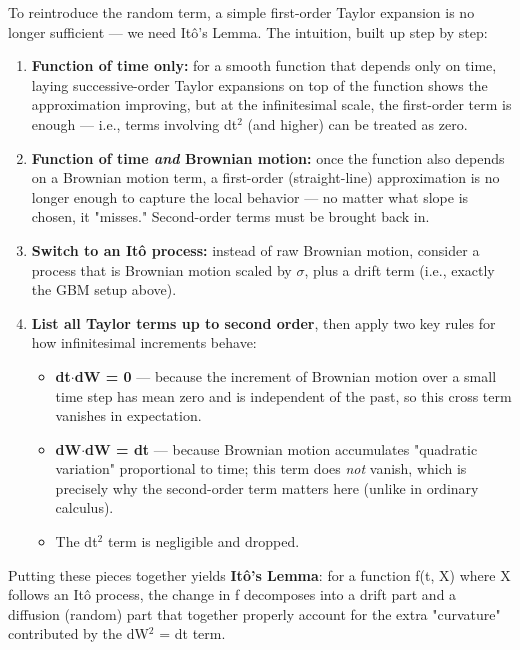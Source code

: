 \documentclass[12pt,openany]{book}
\theoremstyle{definition}
\theoremstyle{remark}
\begin{document}
To reintroduce the random term, a simple first-order Taylor expansion is no longer sufficient --- we need Itô's Lemma. The intuition, built up step by step:

\begin{enumerate}
\item \textbf{Function of time only:} for a smooth function that depends only on time, laying successive-order Taylor expansions on top of the function shows the approximation improving, but at the infinitesimal scale, the first-order term is enough --- i.e., terms involving dt\(^2\) (and higher) can be treated as zero.


\item \textbf{Function of time \emph{and} Brownian motion:} once the function also depends on a Brownian motion term, a first-order (straight-line) approximation is no longer enough to capture the local behavior --- no matter what slope is chosen, it "misses." Second-order terms must be brought back in.


\item \textbf{Switch to an Itô process:} instead of raw Brownian motion, consider a process that is Brownian motion scaled by \(\sigma\), plus a drift term (i.e., exactly the GBM setup above).


\item \textbf{List all Taylor terms up to second order}, then apply two key rules for how infinitesimal increments behave:

\begin{itemize}
\item \textbf{dt\(\cdot\)dW = 0} --- because the increment of Brownian motion over a small time step has mean zero and is independent of the past, so this cross term vanishes in expectation.


\item \textbf{dW\(\cdot\)dW = dt} --- because Brownian motion accumulates "quadratic variation" proportional to time; this term does \emph{not} vanish, which is precisely why the second-order term matters here (unlike in ordinary calculus).


\item The dt\(^2\) term is negligible and dropped.


\end{itemize}


\end{enumerate}

Putting these pieces together yields \textbf{Itô's Lemma}: for a function f(t, X) where X follows an Itô process, the change in f decomposes into a drift part and a diffusion (random) part that together properly account for the extra "curvature" contributed by the dW\(^2\) = dt term.
\end{document}
